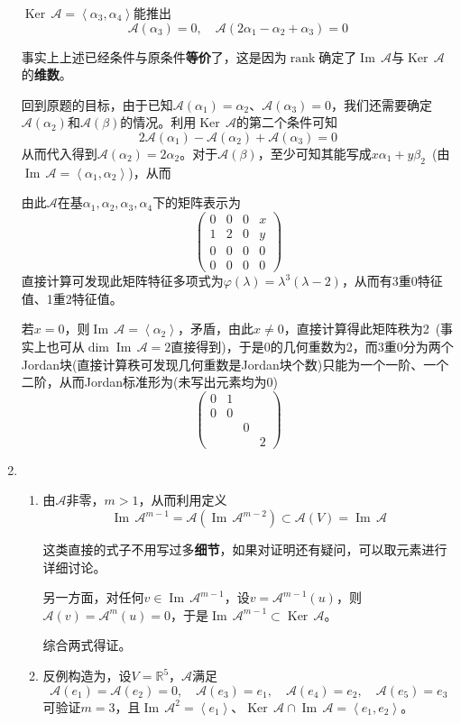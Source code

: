 \documentclass[a4paper,UTF8,fontset=windows,AutoFakeBold]{ctexart}
\DeclareMathOperator{\rank}{rank}
\DeclareMathOperator{\im}{Im\,}
\DeclareMathOperator{\Ker}{Ker\,}
\newcommand*{\ma}{\mathcal{A}}
\newcommand*{\note}{\noindent *}
\begin{document}
\begin{enumerate}
    $\Ker\ma=\left<\alpha_3,\alpha_4\right>$能推出
    $$\ma(\alpha_3)=0,\quad \ma(2\alpha_1-\alpha_2+\alpha_3)=0$$
    
    \note 事实上上述已经条件与原条件\textbf{等价}了，这是因为$\rank$确定了$\im\ma$与$\Ker\ma$的\textbf{维数}。

    回到原题的目标，由于已知$\ma(\alpha_1)=\alpha_2$、$\ma(\alpha_3)=0$，我们还需要确定$\ma(\alpha_2)$和$\ma(\beta)$的情况。利用$\Ker\ma$的第二个条件可知
    $$2\ma(\alpha_1)-\ma(\alpha_2)+\ma(\alpha_3)=0$$
    从而代入得到$\ma(\alpha_2)=2\alpha_2$。对于$\ma(\beta)$，至少可知其能写成$x\alpha_1+y\beta_2$\ (由$\im\ma=\left<\alpha_1,\alpha_2\right>$)，从而
    
    由此$\ma$在基$\alpha_1,\alpha_2,\alpha_3,\alpha_4$下的矩阵表示为
    $$\begin{pmatrix}0&0&0&x\\1&2&0&y\\0&0&0&0\\0&0&0&0\end{pmatrix}$$
    直接计算可发现此矩阵特征多项式为$\varphi(\lambda)=\lambda^3(\lambda-2)$，从而有3重0特征值、1重2特征值。

    若$x=0$，则$\im\ma=\left<\alpha_2\right>$，矛盾，由此$x\ne0$，直接计算得此矩阵秩为2\ (事实上也可从$\dim\im\ma=2$直接得到)，于是0的几何重数为2，而3重0分为两个Jordan块(直接计算秩可发现几何重数是Jordan块个数)只能为一个一阶、一个二阶，从而Jordan标准形为(未写出元素均为0)
    $$\begin{pmatrix}0&1\\0&0\\ &&0\\ &&&2\end{pmatrix}$$

    \item
    \begin{enumerate}
        \item 由$\ma$非零，$m>1$，从而利用定义
        $$\im\ma^{m-1}=\ma(\im\ma^{m-2})\subset\ma(V)=\im\ma$$

        \note 这类直接的式子不用写过多\textbf{细节}，如果对证明还有疑问，可以取元素进行详细讨论。

        另一方面，对任何$v\in\im\ma^{m-1}$，设$v=\ma^{m-1}(u)$，则$\ma(v)=\ma^m(u)=0$，于是$\im\ma^{m-1}\subset\Ker\ma$。

        综合两式得证。

        \item
        反例构造为，设$V=\mathbb{R}^5$，$\ma$满足
        $$\ma(e_1)=\ma(e_2)=0,\quad\ma(e_3)=e_1,\quad\ma(e_4)=e_2,\quad\ma(e_5)=e_3$$
        可验证$m=3$，且$\im\ma^2=\left<e_1\right>$、$\Ker\ma\cap\im\ma=\left<e_1,e_2\right>$。


\end{enumerate}
\end{enumerate}
\end{document}
